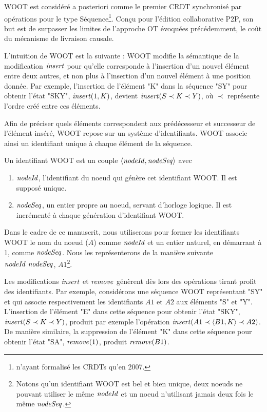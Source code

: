 WOOT \cite{2006-woot-oster} est considéré a posteriori comme le premier \ac{CRDT} synchronisé par opérations pour le type Séquence\footnote{\cite{2007-crdt-shapiro} n'ayant formalisé les \acp{CRDT} qu'en 2007.}.
Conçu pour l'édition collaborative \ac{P2P}, son but est de surpasser les limites de l'approche \ac{OT} évoquées précédemment, \ie le coût du mécanisme de livraison causale.

L'intuition de WOOT est la suivante : WOOT modifie la sémantique de la modification $\mathit{insert}$ pour qu'elle corresponde à l'insertion d'un nouvel élément entre deux autres, et non plus à l'insertion d'un nouvel élément à une position donnée.
Par exemple, l'insertion de l'élément "K" dans la séquence "SY" pour obtenir l'état "SKY", \ie $\mathit{insert}(1, K)$, devient $\mathit{insert}(S \prec K \prec Y)$, où $\prec$ représente l'ordre créé entre ces éléments.

Afin de préciser quels éléments correspondent aux prédécesseur et successeur de l'élément inséré, WOOT repose sur un système d'identifiants.
WOOT associe ainsi un identifiant unique à chaque élément de la séquence.
\begin{definition}
  Un identifiant WOOT est un couple $\langle \mathit{nodeId}, \mathit{nodeSeq} \rangle$ avec
  \begin{enumerate}
    \item $\mathit{nodeId}$, l'identifiant du noeud qui génère cet identifiant WOOT.
      Il est supposé unique.
    \item $\mathit{nodeSeq}$, un entier propre au noeud, servant d'horloge logique.
      Il est incrémenté à chaque génération d'identifiant WOOT.
  \end{enumerate}
\end{definition}
Dans le cadre de ce manuscrit, nous utiliserons pour former les identifiants WOOT le nom du noeud (\eg $A$) comme $\mathit{nodeId}$ et un entier naturel, en démarrant à 1, comme $\mathit{nodeSeq}$.
Nous les représenterons de la manière suivante $\mathit{nodeId}~\mathit{nodeSeq}$, \eg $A1$\footnote{Notons qu'un identifiant WOOT est bel et bien unique, deux noeuds ne pouvant utiliser le même $\mathit{nodeId}$ et un noeud n'utilisant jamais deux fois le même $\mathit{nodeSeq}$.}.

Les modifications $\mathit{insert}$ et $\mathit{remove}$ génèrent dès lors des opérations tirant profit des identifiants.
Par exemple, considérons une séquence WOOT représentant "SY" et qui associe respectivement les identifiants $A1$ et $A2$ aux éléments "S" et "Y".
L'insertion de l'élément "E" dans cette séquence pour obtenir l'état "SKY", \ie $\mathit{insert}(S \prec K \prec Y)$, produit par exemple l'opération $\mathit{insert}(A1 \prec \langle B1,K \rangle \prec A2)$.
De manière similaire, la suppression de l'élément "K" dans cette séquence pour obtenir l'état "SA", \ie $\mathit{remove}(1)$, produit $\mathit{remove}(B1)$.

